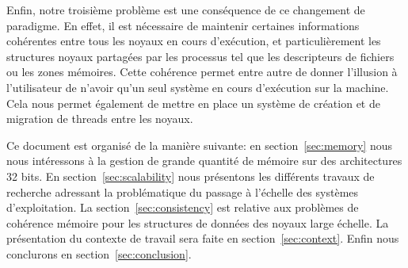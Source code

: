   Enfin, notre troisième problème est une conséquence de ce changement de
  paradigme. En effet, il est nécessaire de maintenir certaines informations
  cohérentes entre tous les noyaux en cours d'exécution, et particulièrement les
  structures noyaux partagées par les processus tel que les descripteurs de
  fichiers ou les zones mémoires. Cette cohérence permet entre autre de donner
  l'illusion à l'utilisateur de n'avoir qu'un seul système en cours d'exécution
  sur la machine. Cela nous permet également de mettre en place un système de
  création et de migration de threads entre les noyaux.\newline

  \hspace{1cm}Ce document est organisé de la manière suivante: en
  section~\ref{sec:memory} nous nous intéressons à la gestion de grande quantité
  de mémoire sur des architectures 32 bits. En section~\ref{sec:scalability}
  nous présentons les différents travaux de recherche adressant la problématique
  du passage à l'échelle des systèmes d'exploitation.  La
  section~\ref{sec:consistency} est relative aux problèmes de cohérence mémoire
  pour les structures de données des noyaux large échelle. La présentation du
  contexte de travail sera faite en section~\ref{sec:context}. Enfin nous
  conclurons en section~\ref{sec:conclusion}.\newline
